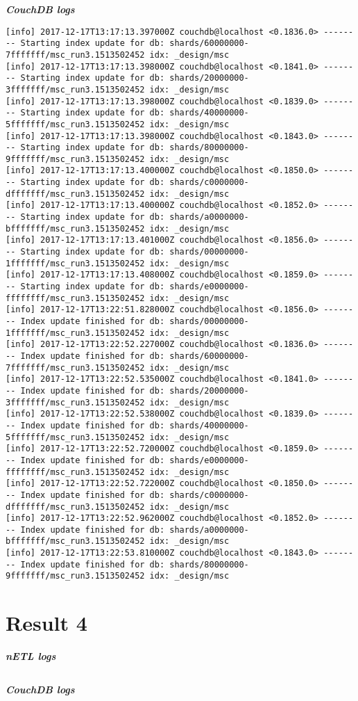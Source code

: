 \textit{\textbf{CouchDB logs}}
\begin{verbatim}
[info] 2017-12-17T13:17:13.397000Z couchdb@localhost <0.1836.0> -------- Starting index update for db: shards/60000000-7fffffff/msc_run3.1513502452 idx: _design/msc
[info] 2017-12-17T13:17:13.398000Z couchdb@localhost <0.1841.0> -------- Starting index update for db: shards/20000000-3fffffff/msc_run3.1513502452 idx: _design/msc
[info] 2017-12-17T13:17:13.398000Z couchdb@localhost <0.1839.0> -------- Starting index update for db: shards/40000000-5fffffff/msc_run3.1513502452 idx: _design/msc
[info] 2017-12-17T13:17:13.398000Z couchdb@localhost <0.1843.0> -------- Starting index update for db: shards/80000000-9fffffff/msc_run3.1513502452 idx: _design/msc
[info] 2017-12-17T13:17:13.400000Z couchdb@localhost <0.1850.0> -------- Starting index update for db: shards/c0000000-dfffffff/msc_run3.1513502452 idx: _design/msc
[info] 2017-12-17T13:17:13.400000Z couchdb@localhost <0.1852.0> -------- Starting index update for db: shards/a0000000-bfffffff/msc_run3.1513502452 idx: _design/msc
[info] 2017-12-17T13:17:13.401000Z couchdb@localhost <0.1856.0> -------- Starting index update for db: shards/00000000-1fffffff/msc_run3.1513502452 idx: _design/msc
[info] 2017-12-17T13:17:13.408000Z couchdb@localhost <0.1859.0> -------- Starting index update for db: shards/e0000000-ffffffff/msc_run3.1513502452 idx: _design/msc
[info] 2017-12-17T13:22:51.828000Z couchdb@localhost <0.1856.0> -------- Index update finished for db: shards/00000000-1fffffff/msc_run3.1513502452 idx: _design/msc
[info] 2017-12-17T13:22:52.227000Z couchdb@localhost <0.1836.0> -------- Index update finished for db: shards/60000000-7fffffff/msc_run3.1513502452 idx: _design/msc
[info] 2017-12-17T13:22:52.535000Z couchdb@localhost <0.1841.0> -------- Index update finished for db: shards/20000000-3fffffff/msc_run3.1513502452 idx: _design/msc
[info] 2017-12-17T13:22:52.538000Z couchdb@localhost <0.1839.0> -------- Index update finished for db: shards/40000000-5fffffff/msc_run3.1513502452 idx: _design/msc
[info] 2017-12-17T13:22:52.720000Z couchdb@localhost <0.1859.0> -------- Index update finished for db: shards/e0000000-ffffffff/msc_run3.1513502452 idx: _design/msc
[info] 2017-12-17T13:22:52.722000Z couchdb@localhost <0.1850.0> -------- Index update finished for db: shards/c0000000-dfffffff/msc_run3.1513502452 idx: _design/msc
[info] 2017-12-17T13:22:52.962000Z couchdb@localhost <0.1852.0> -------- Index update finished for db: shards/a0000000-bfffffff/msc_run3.1513502452 idx: _design/msc
[info] 2017-12-17T13:22:53.810000Z couchdb@localhost <0.1843.0> -------- Index update finished for db: shards/80000000-9fffffff/msc_run3.1513502452 idx: _design/msc
\end{verbatim}


\section{Result 4}
\textit{\textbf{nETL logs}}
\begin{verbatim}
\end{verbatim}

\textit{\textbf{CouchDB logs}}
\begin{verbatim}
\end{verbatim}



